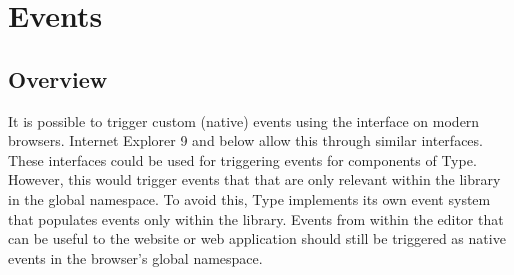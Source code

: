 









\section{Events}
\label{sec:events}
\subsection{Overview}

It is possible to trigger custom (native) events using the  interface on modern browsers\cite{mozev}. Internet Explorer 9 and below allow this through similar interfaces. These interfaces could be used for triggering events for components of Type. However, this would trigger events that that are only relevant within the library in the global namespace. To avoid this, Type implements its own event system that populates events only within the library. Events from within the editor that can be useful to the website or web application should still be triggered as native events in the browser's global namespace. %

